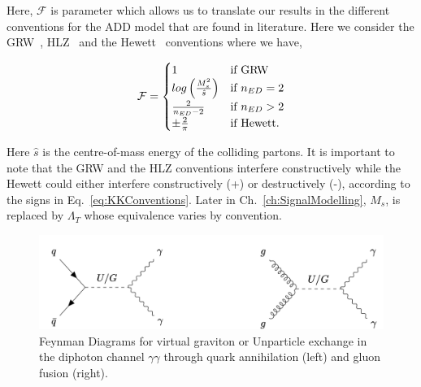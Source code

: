 Here, $\mathcal{F}$ is parameter which allows us to translate our results in the different conventions for the ADD model that are found in literature. Here we  consider the GRW~\cite{Giudice:1998ck}, HLZ~\cite{Han:1998sg} and the Hewett~\cite{Hewett:1998sn} conventions where we have, 

\begin{equation}
\mathcal{F}=
    \begin{cases}
        1 & \text{if } \textnormal{GRW} \\
        log\left(\frac{M^2_s}{\hat{s}}\right) & \text{if } n_{ED} = 2 \\
        \frac{2}{n_{ED} - 2} & \text{if } n_{ED} > 2 \\
        \pm \frac{2}{\pi} & \text{if } \textnormal{Hewett}.
    \end{cases}
    \label{eq:KKConventions}
\end{equation} 

Here $\hat{s}$ is the centre-of-mass energy of the colliding partons. It is important to note that the GRW and the HLZ conventions interfere constructively while the Hewett could either interfere constructively (+) or destructively (-), according to the signs in Eq.~\ref{eq:KKConventions}. Later in Ch.~\ref{ch:SignalModelling}, $M_s$, is replaced by $\Lambda_{T}$ whose equivalence varies by convention.




\begin{figure}
    \centering
    \includegraphics[scale=0.5]{fig/FeynmanDiagramUG.png}
    \caption{Feynman Diagrams for virtual graviton or Unparticle exchange in the diphoton channel $\gamma\gamma$ through quark annihilation (left) and gluon fusion (right).}
    \label{fig:FeynmanDiagramUG}
\end{figure}

